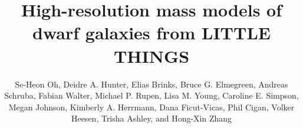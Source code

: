 \documentclass[natbib209]{emulateapj}
\begin{document}
\newcommand{\C}{\ensuremath{\mathfrak{C}}}
\newcommand{\VNFW}{\ensuremath{V_{200}}}
\newcommand{\Vh}{\ensuremath{V_h}}
\newcommand{\kms}{\ensuremath{\mathrm{km}\,\mathrm{s}^{-1}}}
\newcommand{\cm}{\ensuremath{\mathrm{cm}^{-2}}}
\newcommand{\kmsnospace}{\ensuremath{\mathrm{km}\,\mathrm{s}^{-1}}}
\newcommand{\barkms}{\ensuremath{\mathrm{km}\,\mathrm{s}^{-1}\,\mathrm{kpc}^{-1}}}
\newcommand{\kmsMpc}{\ensuremath{\mathrm{km}\,\mathrm{s}^{-1}\,\mathrm{Mpc}^{-1}}}
\newcommand{\etal}{et al.}
\newcommand{\LCDM}{$\Lambda$CDM}
\newcommand{\ML}{\ensuremath{\Upsilon_{\star}}}
\newcommand{\MLfix}{\ensuremath{\Upsilon_{\star}^{fix}}}
\newcommand{\MLfree}{\ensuremath{\Upsilon_{\star}^{\rm free}}}
\newcommand{\MLsps}{\ensuremath{\Upsilon_{\star}^{3.6}}}
\newcommand{\MLspl}{\ensuremath{\Upsilon_{\star}^{4.5}}}
\newcommand{\MLk}{\ensuremath{\Upsilon_{\star}^{K}}}
\newcommand{\MLb}{\ensuremath{\Upsilon_{\star}^{B}}}
\newcommand{\MLmax}{\ensuremath{\Upsilon_{max}}}
\newcommand{\Lsun}{\ensuremath{\rm{{L}_{\odot}}}}
\newcommand{\Msun}{\ensuremath{\rm{{M}_{\odot}}}}
\newcommand{\mass}{\ensuremath{\rm{{\cal M}}}}
\newcommand{\magsq}{\ensuremath{\mathrm{mag}\,\mathrm{arcsec}^{-2}}}
\newcommand{\Lsundens}{\ensuremath{\rm L_{\odot}\,\mathrm{pc}^{-2}}}
\newcommand{\surfdens}{\ensuremath{\rm M_{\odot}\,\mathrm{pc}^{-2}}}
\newcommand{\cubedens}{\ensuremath{M_{\odot}\,\mathrm{pc}^{-3}}}

\long{}
\long{}

\title{High-resolution mass models of dwarf galaxies from LITTLE THINGS}

\author{Se-Heon Oh, Deidre A. Hunter, Elias
Brinks, Bruce G. Elmegreen, Andreas
Schruba, Fabian Walter, Michael P.
Rupen, Lisa M. Young, Caroline E.
Simpson, Megan Johnson, Kimberly A.
Herrmann, Dana Ficut-Vicas, Phil
Cigan, Volker Heesen, Trisha
Ashley, and Hong-Xin Zhang}

\end{document}
